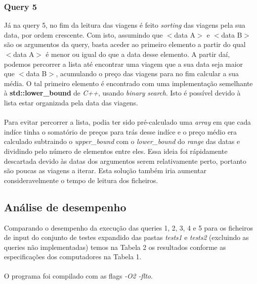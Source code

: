 \documentclass{article}
\begin{document}
        \subsubsection{Query 5}
            \newcommand{\param}[1]{$<${#1}$>$}
            Já na query 5, no fim da leitura das viagens é feito \emph{sorting}
            das viagens pela sua data, por ordem crescente. Com isto, assumindo 
            que \param{data A} e \param{data B} são os argumentos da query, 
            basta aceder ao primeiro elemento a partir do qual \param{data A} é 
            menor ou igual do que a data desse elemento. A partir daí, podemos
            percorrer a lista até encontrar uma viagem que a sua data seja
            maior que \param{data B}, acumulando o preço das viagens para no fim
            calcular a sua média. O tal primeiro elemento é encontrado com
            uma implementação semelhante à \textbf{std::lower\_bound} de \emph{C++},
            usando \emph{binary search}. Isto é possível devido à lista estar
            organizada pela data das viagens.
            \\
            \\Para evitar percorrer a lista, podia ter sido pré-calculado uma \emph{array}
            em que cada indíce tinha o somatório de preços para trás desse indíce
            e o preço médio era calculado subtraindo o \emph{upper\_bound}
            com o \emph{lower\_bound} do \emph{range} das datas e dividindo pelo 
            número de elementos entre eles. Essa ideia foi rápidamente descartada
            devido às datas dos argumentos serem relativamente perto, portanto
            são poucas as viagens a iterar. Esta solução também iria aumentar 
            consideravelmente o tempo de leitura dos ficheiros.

        \newpage
        \subsection{Análise de desempenho}
            Comparando o desempenho da execução das queries 1, 2, 3, 4 e 5 para 
            os ficheiros de input do conjunto de testes expandido das pastas 
            \emph{tests1} e \emph{tests2} (excluindo as queries não 
            implementadas) temos na Tabela 2 os resultados conforme as 
            especificações dos computadores na Tabela 1.
            \\
            \\O programa foi compilado com as flags \emph{-O2 -flto}.
            
\end{document}
